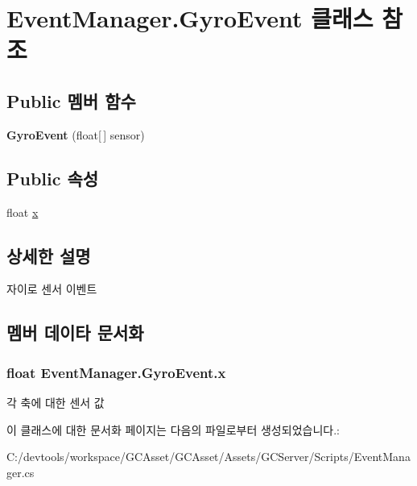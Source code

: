\hypertarget{class_event_manager_1_1_gyro_event}{}\section{Event\+Manager.\+Gyro\+Event 클래스 참조}
\label{class_event_manager_1_1_gyro_event}
\subsection*{Public 멤버 함수}
\begin{DoxyCompactItemize}
\item 
\hypertarget{class_event_manager_1_1_gyro_event_af0a8874c2f307f27846cf7a11d2dae1e}{}{\bfseries Gyro\+Event} (float\mbox{[}$\,$\mbox{]} sensor)\label{class_event_manager_1_1_gyro_event_af0a8874c2f307f27846cf7a11d2dae1e}

\end{DoxyCompactItemize}
\subsection*{Public 속성}
\begin{DoxyCompactItemize}
\item 
float \hyperlink{class_event_manager_1_1_gyro_event_aac433f18595b0ef2df86f6fadb79c8bc}{x}
\end{DoxyCompactItemize}


\subsection{상세한 설명}
자이로 센서 이벤트 

\subsection{멤버 데이타 문서화}
\hypertarget{class_event_manager_1_1_gyro_event_aac433f18595b0ef2df86f6fadb79c8bc}{}
\subsubsection[{x}]{\setlength{\rightskip}{0pt plus 5cm}float Event\+Manager.\+Gyro\+Event.\+x}\label{class_event_manager_1_1_gyro_event_aac433f18595b0ef2df86f6fadb79c8bc}
각 축에 대한 센서 값 

이 클래스에 대한 문서화 페이지는 다음의 파일로부터 생성되었습니다.\+:\begin{DoxyCompactItemize}
\item 
C\+:/devtools/workspace/\+G\+C\+Asset/\+G\+C\+Asset/\+Assets/\+G\+C\+Server/\+Scripts/Event\+Manager.\+cs\end{DoxyCompactItemize}
